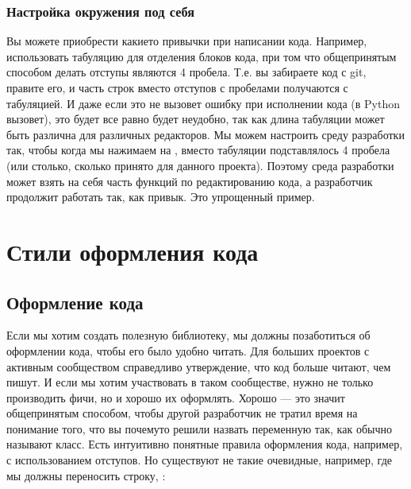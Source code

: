 \documentclass[letterpaper,10pt,russian]{sphinxmanual}
\begin{document}
\subsection{Настройка окружения под себя}
\label{\detokenize{educational_materials/ide/content:id6}}
\sphinxAtStartPar
Вы можете приобрести какие\sphinxhyphen{}то привычки при написании кода. Например, использовать табуляцию для отделения блоков кода, при том что общепринятым способом делать отступы являются 4 пробела. Т.е. вы забираете код с git, правите его, и часть строк вместо отступов с пробелами получаются с табуляцией. И даже если это не вызовет ошибку при исполнении кода (в Python вызовет), это будет все равно будет неудобно, так как длина табуляции может быть различна для различных редакторов. Мы можем настроить среду разработки так, чтобы когда мы нажимаем на , вместо табуляции подставлялось 4 пробела (или столько, сколько принято для данного проекта). Поэтому среда разработки может взять на себя часть функций по редактированию кода, а разработчик продолжит работать так, как привык. Это упрощенный пример.


\chapter{Стили оформления кода}
\label{\detokenize{index:id5}}
\sphinxstepscope


\section{Оформление кода}
\label{\detokenize{educational_materials/styles/content:id1}}\label{\detokenize{educational_materials/styles/content::doc}}
\sphinxAtStartPar
Если мы хотим создать полезную библиотеку, мы должны позаботиться об оформлении кода, чтобы его было удобно читать. Для больших проектов с активным сообществом справедливо утверждение, что код больше читают, чем пишут. И если мы хотим участвовать в таком сообществе, нужно не только производить фичи, но и хорошо их оформлять. Хорошо — это значит общепринятым способом, чтобы другой разработчик не тратил время на понимание того, что вы почему\sphinxhyphen{}то решили назвать переменную так, как обычно называют класс. Есть интуитивно понятные правила оформления кода, например, с использованием отступов. Но существуют не такие очевидные, например, где мы должны переносить строку, :
\end{document}
